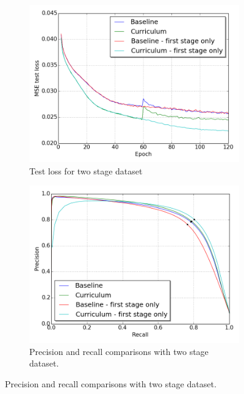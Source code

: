 
\begin{figure}
\begin{subfigure}{0.5\textwidth}
\includegraphics[width=\linewidth]{figs/E6/E6_lc_two_stage.png}

\caption{Test loss for two stage dataset}
\vspace{0.4cm} 
\label{fig:E6_curriculum_inexperienced_loss}
\end{subfigure}
\hspace*{\fill} %
\begin{subfigure}{0.5\textwidth}
\includegraphics[width=\linewidth]{figs/E6/E6_pr_two_stage.png}
\caption{Precision and recall comparisons with two stage dataset.} \label{fig:E6_curriculum_inexperienced_pr}
\end{subfigure}


\end{figure}
